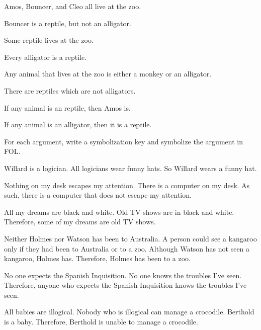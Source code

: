 \begin{earg}
\item Amos, Bouncer, and Cleo all live at the zoo.
\item Bouncer is a reptile, but not an alligator.
\item Some reptile lives at the zoo.
\item Every alligator is a reptile.
\item Any animal that lives at the zoo is either a monkey or an alligator.
\item There are reptiles which are not alligators.
\item If any animal is an reptile, then Amos is.
\item If any animal is an alligator, then it is a reptile.
\end{earg}

\problempart
\label{pr.FOLarguments}
For each argument, write a symbolization key and symbolize the argument in FOL.
\begin{earg}
\item Willard is a logician. All logicians wear funny hats. So Willard wears a funny hat.
\item Nothing on my desk escapes my attention. There is a computer on my desk. As such, there is a computer that does not escape my attention.
\item All my dreams are black and white. Old TV shows are in black and white. Therefore, some of my dreams are old TV shows.
\item Neither Holmes nor Watson has been to Australia. A person could see a kangaroo only if they had been to Australia or to a zoo. Although Watson has not seen a kangaroo, Holmes has. Therefore, Holmes has been to a zoo.
\item No one expects the Spanish Inquisition. No one knows the troubles I've seen. Therefore, anyone who expects the Spanish Inquisition knows the troubles I've seen.
\item All babies are illogical. Nobody who is illogical can manage a crocodile. Berthold is a baby. Therefore, Berthold is unable to manage a crocodile.
\end{earg}

